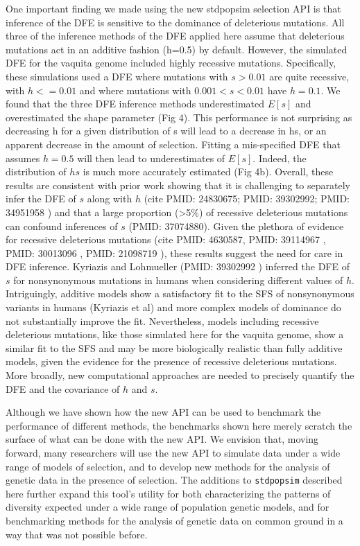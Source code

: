 \documentclass[hidelinks]{article}
\newcommand{\stdpopsim}{\texttt{stdpopsim}\xspace}
\begin{document}
    One important finding we made using the new stdpopsim selection API is that inference of the DFE is sensitive to the dominance of deleterious mutations. All three of the inference methods of the DFE applied here assume that deleterious mutations act in an additive fashion (h=0.5) by default. However, the simulated DFE for the vaquita genome included highly recessive mutations. Specifically, these simulations used a DFE where mutations with $s>0.01$ are quite recessive, with $h<=0.01$ and where mutations with $0.001<s<0.01$ have $h=0.1$. We found that the three DFE inference methods underestimated $E[s]$ and overestimated the shape parameter (Fig 4). This performance is not surprising as decreasing h for a given distribution of s will lead to a decrease in hs, or an apparent decrease in the amount of selection. Fitting a mis-specified DFE that assumes $h=0.5$ will then lead to underestimates of $E[s]$. Indeed, the distribution of $hs$ is much more accurately estimated (Fig 4b). Overall, these results are consistent with prior work showing that it is challenging to separately infer the DFE of $s$ along with $h$ (cite PMID: 24830675; PMID: 39302992; PMID: 34951958 ) and that a large proportion (>5\%) of recessive deleterious mutations can confound inferences of $s$ (PMID: 37074880). 
Given the plethora of evidence for recessive deleterious mutations (cite PMID: 4630587, PMID: 39114967 , PMID: 30013096 , PMID: 21098719 ), these results suggest the need for care in DFE inference. Kyriazis and Lohmueller (PMID: 39302992 ) inferred the DFE of $s$ for nonsynonymous mutations in humans when considering different values of $h$. Intriguingly, additive models show a satisfactory fit to the SFS of nonsynonymous variants in humans (Kyriazis et al) and more complex models of dominance do not substantially improve the fit. Nevertheless, models including recessive deleterious mutations, like those simulated here for the vaquita genome, show a similar fit to the SFS and may be more biologically realistic than fully additive models, given the evidence for the presence of recessive deleterious mutations. More broadly, new computational approaches are needed to precisely quantify the DFE and the covariance of $h$ and $s$.


    Although we have shown how the new API can be used to benchmark the performance of different methods,
    the benchmarks shown here merely scratch the surface of what can be done with the new API.
    We envision that, moving forward, many researchers will use
    the new API to simulate data under a wide range of models of selection, and to develop
    new methods for the analysis of genetic data in the presence of selection. 
    The additions to \stdpopsim described here further expand this tool's utility for both 
    characterizing the patterns of diversity expected under a wide range of population genetic
    models, and for benchmarking methods for the analysis of genetic data
    on common ground
    in a way that was not possible before.
\end{document}
